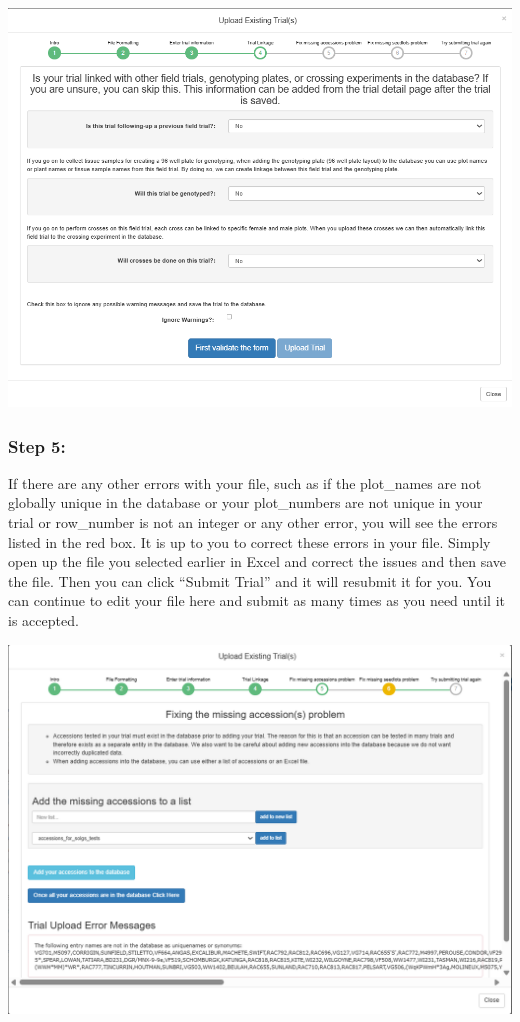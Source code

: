 \documentclass[
  12pt,
]{book}
\begin{document}
\begin{center}\includegraphics[width=0.95\linewidth]{assets/images/manage_trials_upload_trial_4} \end{center}

\hypertarget{step-5}{%
\subsubsection*{Step 5:}\label{step-5}}


If there are any other errors with your file, such as if the plot\_names are not globally unique in the database or your plot\_numbers are not unique in your trial or row\_number is not an integer or any other error, you will see the errors listed in the red box. It is up to you to correct these errors in your file. Simply open up the file you selected earlier in Excel and correct the issues and then save the file. Then you can click ``Submit Trial'' and it will resubmit it for you. You can continue to edit your file here and submit as many times as you need until it is accepted.

\begin{center}\includegraphics[width=0.95\linewidth]{assets/images/manage_trials_upload_trial_5} \end{center}
\end{document}
